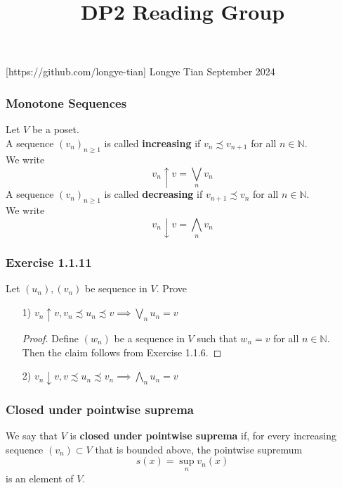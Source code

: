 \documentclass[11pt,xcolor={dvipsnames},hyperref={pdftex,pdfpagemode=UseNone,hidelinks,pdfdisplaydoctitle=true},usepdftitle=false]{beamer}
\begin{document}
\title{DP2 Reading Group}

\information
%
[https://github.com/longye-tian]
%
{Longye Tian}
%
{September 2024}

\frame{\titlepage}


\begin{frame}
\frametitle{Monotone Sequences}
\begin{definition}
Let $V$ be a poset.\\
A sequence $(v_n)_{n\ge 1}$ is called \textbf{increasing} if $v_n\precsim v_{n+1}$ for all $n\in\mathbb{N}$.\\
We write 
$$
v_n\uparrow v=\bigvee_n v_n
$$
A sequence $(v_n)_{n\ge 1}$ is called \textbf{decreasing} if $v_{n+1}\precsim v_{n}$ for all $n\in\mathbb{N}$.\\
We write 
$$
v_n\downarrow v=\bigwedge_n v_n
$$
\end{definition}
\end{frame}
\begin{frame}
\frametitle{Exercise 1.1.11}
Let  $(u_n), (v_n)$ be sequence in $V$. Prove
\begin{enumerate}
\item[1)] $v_n\uparrow v, v_n\precsim u_n\precsim v\implies \bigvee_n u_n =v$
\begin{proof}
Define $(w_n)$ be a sequence in $V$ such that $w_n =v$ for all $n\in\mathbb{N}$.\\
Then the claim follows from Exercise 1.1.6.
\end{proof}
\item[2)]  $v_n\downarrow v, v\precsim u_n\precsim v_n \implies \bigwedge_n u_n =v$
\end{enumerate}
\end{frame}
\begin{frame}
\frametitle{Closed under pointwise suprema}
\begin{definition}
We say that $V$ is \textbf{closed under pointwise suprema} if, for every increasing sequence $(v_n)\subset V$ that is bounded above, the pointwise supremum
$$
s(x) = \sup_{n} v_n(x)
$$
is an element of $V$.
\end{definition}
\end{frame}
\end{document}

